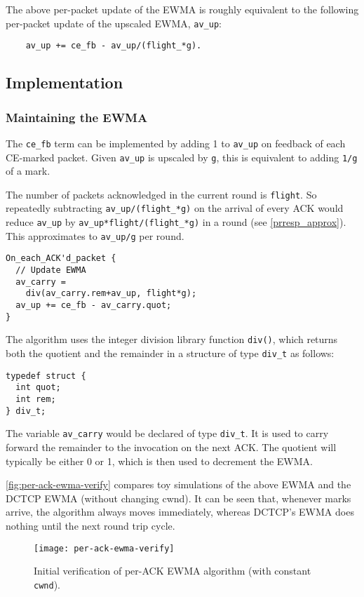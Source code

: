 The above per-packet update of the EWMA is roughly equivalent to the following
per-packet update of the upscaled EWMA, \texttt{av\_up}:
\begin{verbatim}
    av_up += ce_fb - av_up/(flight_*g).
\end{verbatim}

\subsection{Implementation}\label{prresp_implementation}

\subsubsection{Maintaining the EWMA}

The \texttt{ce\_fb} term can be implemented by adding 1 to \texttt{av\_up} on
feedback of each CE-marked packet. Given \texttt{av\_up} is upscaled by
\texttt{g}, this is equivalent to adding \texttt{1/g} of a mark.

The number of packets acknowledged in the current round is \texttt{flight}. So
repeatedly subtracting \texttt{av\_up/(flight\_*g)} on the arrival of every ACK
would reduce \texttt{av\_up} by \texttt{av\_up*flight/(flight\_*g)} in a round
(see \autoref{prresp_approx}). This approximates to \texttt{av\_up/g} per round.

\begin{verbatim}
On_each_ACK'd_packet {
  // Update EWMA
  av_carry = 
    div(av_carry.rem+av_up, flight*g);
  av_up += ce_fb - av_carry.quot;
}
\end{verbatim}

The algorithm uses the integer division library function \texttt{div()}, which returns both the quotient and the remainder in a structure of type \texttt{div\_t} as follows:
\begin{verbatim}
typedef struct {
  int quot;
  int rem;
} div_t;
\end{verbatim}
The variable \texttt{av\_carry} would be declared of type \texttt{div\_t}. It is used to carry forward the remainder to the invocation on the next ACK. The quotient will typically be either 0 or 1, which is then used to decrement the EWMA.

\autoref{fig:per-ack-ewma-verify} compares toy simulations of the above EWMA and
the DCTCP EWMA (without changing cwnd). It can be seen that, whenever marks
arrive, the algorithm always moves immediately, whereas DCTCP's EWMA does
nothing until the next round trip cycle.
\begin{figure}[h]
	\texttt{[image: per-ack-ewma-verify]}
	\caption{Initial verification of per-ACK EWMA algorithm (with constant \texttt{cwnd}).}\label{fig:per-ack-ewma-verify}
\end{figure}

